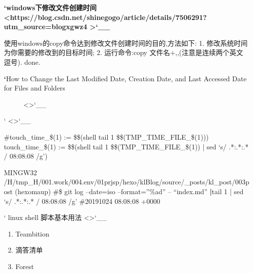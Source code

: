 \documentclass[letterpaper,12pt,english]{sphinxmanual}
\begin{document}

{\color{red}\bfseries{}`windows下修改文件创建时间 <https://blog.csdn.net/shinegogo/article/details/7506291?utm\_source=blogxgwz4
>`\_\_}

使用windows的copy命令达到修改文件创建时间的目的,方法如下:
1. 修改系统时间为你需要的修改到的目标时间;
2. 运行命令:copy 文件名+,,(注意是连续两个英文逗号).
done.
\begin{description}
\item[{{\color{red}\bfseries{}`}How to Change the Last Modified Date, Creation Date, and Last Accessed Date for Files and Folders}] \leavevmode
<>`\_\_

\end{description}



` <>`\_\_

\#touch\_time\_\$(1) := \$\$(shell tail \sphinxhyphen{}1 \$\$(TMP\_TIME\_FILE\_\$(1)))
touch\_time\_\$(1) := \$\$(shell tail \sphinxhyphen{}1 \$\$(TMP\_TIME\_FILE\_\$(1)) | sed ‘s/ .*:.*:.* / 08:08:08 /g’)

 MINGW32 /H/tmp\_H/001.work/004.env/01prjsp/hexo/klBlog/source/\_posts/kl\_post/003post (hexo\sphinxhyphen{}maup)
\#\$ git log –date=iso –format=”\%ad” – “index.md” {\color{red}\bfseries{}|}tail \sphinxhyphen{}1 | sed ‘s/ .*:.*:.* / 08:08:08 /g’
\#2019\sphinxhyphen{}10\sphinxhyphen{}24 08:08:08 +0000



`
linux shell 脚本基本用法 <>`\_\_


\begin{enumerate}
%
\item {} 
Teambition

\item {} 
滴答清单

\item {} 
Forest

\end{enumerate}
\end{document}
